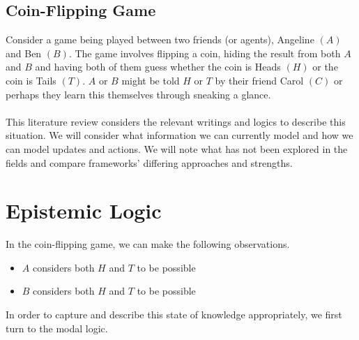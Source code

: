 \documentclass[10pt, a4paper, twoside]{article}
\begin{document}
\subsection{Coin-Flipping Game}\label{intro_coinFlipping}
Consider a game being played between two friends (or agents), Angeline $(A)$
and Ben $(B)$.
The game involves flipping a coin, hiding the result from both $A$ and $B$ and
having both of them guess whether the coin is Heads $(H)$ or the coin is Tails
$(T)$.
$A$ or $B$ might be told $H$ or $T$ by their friend Carol $(C)$ or perhaps they
learn this themselves through sneaking a glance.\\
\\
This literature review considers the relevant writings and logics to describe
this situation.
We will consider what information we can currently model and how we can model
updates and actions.
We will note what has not been explored in the fields and compare frameworks'
differing approaches and strengths.

\section{Epistemic Logic}\label{epistemic}
In the coin-flipping game, we can make the following observations.
\begin{itemize}
	\item $A$ considers both $H$ and $T$ to be possible
	\item $B$ considers both $H$ and $T$ to be possible
\end{itemize}
In order to capture and describe this state of knowledge appropriately, we
first turn to the modal logic.
\end{document}
